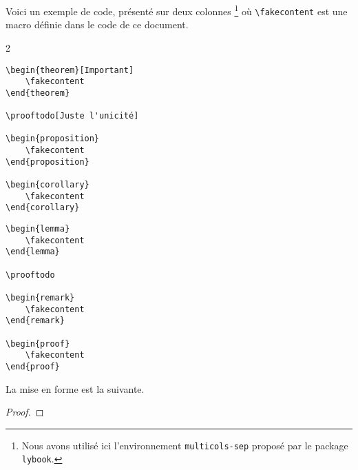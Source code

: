 Voici un exemple de code, présenté sur deux colonnes
\footnote{
	Nous avons utilisé ici l'environnement \texttt{multicols-sep} proposé par le package \texttt{lybook}.
}
où \verb+\fakecontent+ est une macro définie dans le code de ce document.

\begin{frame-gene}
\small
\begin{multicols-sep}{2}
	\begin{verbatim}
\begin{theorem}[Important]
    \fakecontent
\end{theorem}

\prooftodo[Juste l'unicité]

\begin{proposition}
    \fakecontent
\end{proposition}

\begin{corollary}
    \fakecontent
\end{corollary}\end{verbatim}

	\columnbreak
	
	\begin{verbatim}
\begin{lemma}
    \fakecontent
\end{lemma}

\prooftodo

\begin{remark}
    \fakecontent
\end{remark}

\begin{proof}
    \fakecontent
\end{proof}\end{verbatim}
\end{multicols-sep}
\end{frame-gene}


La mise en forme est la suivante.

\begin{frame-gene}
\small
\begin{theorem}[Important]
    \fakecontent
\end{theorem}


\begin{proposition}
    \fakecontent
\end{proposition}

\begin{corollary}
    \fakecontent
\end{corollary}

\begin{lemma}
    \fakecontent
\end{lemma}

\prooftodo

\begin{remark}
    \fakecontent
\end{remark}

\begin{proof}
    \fakecontent
\end{proof}
\end{frame-gene}
